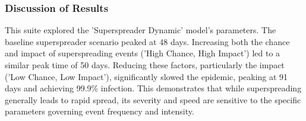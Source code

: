 \documentclass[12pt]{article}
\begin{document}
\begin{table}[H]
\centering
\caption{Summary Metrics for Experiment Suite 4: Superspreader Phenomenon}
\label{tab:exp4_metrics}
\end{table}

\subsubsection*{Discussion of Results}
This suite explored the 'Superspreader Dynamic' model's parameters. The baseline superspreader scenario peaked at 48 days. Increasing both the chance and impact of superspreading events ('High Chance, High Impact') led to a similar peak time of 50 days. Reducing these factors, particularly the impact ('Low Chance, Low Impact'), significantly slowed the epidemic, peaking at 91 days and achieving 99.9\% infection. This demonstrates that while superspreading generally leads to rapid spread, its severity and speed are sensitive to the specific parameters governing event frequency and intensity.
\end{document}
